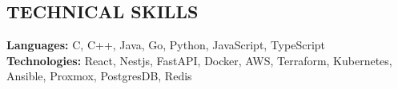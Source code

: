 \documentclass[letterpaper,11pt]{article}
\begin{document}
\begin{justify}


\section{TECHNICAL SKILLS}
 \begin{itemize}[leftmargin=0.15in, label={}]\small{\item{
    \textbf{Languages: }{C, C++, Java, Go, Python, JavaScript, TypeScript} \\
    \textbf{Technologies: }{React, Nestjs, FastAPI, Docker, AWS, Terraform, Kubernetes, Ansible, Proxmox, PostgresDB, Redis} \\
  }}
 \end{itemize}


\end{justify}
\end{document}

